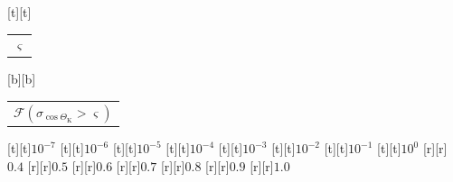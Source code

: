 %    
%
%
\begin{psfrags}%
\psfragscanon%
%
[t][t]{\color[rgb]{0,0,0}\setlength{\tabcolsep}{0pt}\begin{tabular}{c}{\Large$\varsigma$}\end{tabular}}%
[b][b]{\color[rgb]{0,0,0}\setlength{\tabcolsep}{0pt}\begin{tabular}{c}{\Large$\mathcal{F}(\sigma_{\cos \Theta_\mathrm{K}} > \varsigma)$}\end{tabular}}%
%
[t][t]{$10^{-7}$}%
[t][t]{$10^{-6}$}%
[t][t]{$10^{-5}$}%
[t][t]{$10^{-4}$}%
[t][t]{$10^{-3}$}%
[t][t]{$10^{-2}$}%
[t][t]{$10^{-1}$}%
[t][t]{$10^{0}$}%
%
[r][r]{$0.4$}%
[r][r]{$0.5$}%
[r][r]{$0.6$}%
[r][r]{$0.7$}%
[r][r]{$0.8$}%
[r][r]{$0.9$}%
[r][r]{$1.0$}%
%
%
\end{psfrags}%
%
